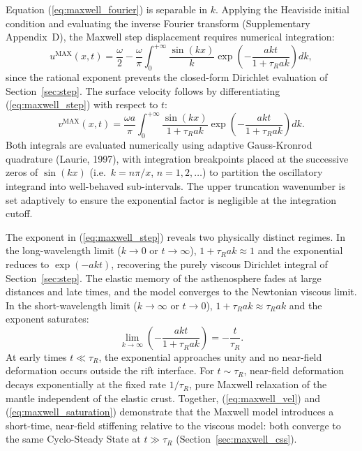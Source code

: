 \documentclass[12pt]{article}
\begin{document}
Equation (\ref{eq:maxwell_fourier}) is separable in $k$. Applying the
Heaviside initial condition and evaluating the inverse Fourier transform
(Supplementary Appendix~D), the Maxwell step displacement requires
numerical integration:
\begin{equation}
u^{\text{MAX}}(x,t) = \frac{\omega}{2}
  - \frac{\omega}{\pi}\int_0^{+\infty}
    \frac{\sin(kx)}{k}\exp\!\left(-\frac{akt}{1+\tau_R ak}\right)dk,
\label{eq:maxwell_step}
\end{equation}
since the rational exponent prevents the closed-form Dirichlet evaluation of
Section~\ref{sec:step}. The surface velocity follows by differentiating
(\ref{eq:maxwell_step}) with respect to $t$:
\begin{equation}
v^{\text{MAX}}(x,t) = \frac{\omega a}{\pi}\int_0^{+\infty}
  \frac{\sin(kx)}{1+\tau_R ak}
  \exp\!\left(-\frac{akt}{1+\tau_R ak}\right)dk.
\label{eq:maxwell_vel}
\end{equation}
Both integrals are evaluated numerically using adaptive Gauss-Kronrod
quadrature (Laurie, 1997), with integration breakpoints placed at the
successive zeros of $\sin(kx)$ (i.e.\ $k = n\pi/x$, $n = 1,2,\ldots$)
to partition the oscillatory integrand into well-behaved sub-intervals.
The upper truncation wavenumber is set adaptively to ensure the
exponential factor is negligible at the integration cutoff.

The exponent in (\ref{eq:maxwell_step}) reveals two physically distinct regimes.
In the long-wavelength limit ($k\to 0$ or $t\to\infty$), $1+\tau_R ak \approx 1$
and the exponential reduces to $\exp(-akt)$, recovering the purely viscous
Dirichlet integral of Section~\ref{sec:step}. The elastic memory of the
asthenosphere fades at large distances and late times, and the model converges
to the Newtonian viscous limit. In the short-wavelength limit ($k\to\infty$ or
$t\to 0$), $1+\tau_R ak \approx \tau_R ak$ and the exponent saturates:
\begin{equation}
\lim_{k\to\infty}\left(-\frac{akt}{1+\tau_R ak}\right) = -\frac{t}{\tau_R}.
\label{eq:maxwell_saturation}
\end{equation}
At early times $t\ll\tau_R$, the exponential approaches unity and no near-field
deformation occurs outside the rift interface. For $t\sim\tau_R$, near-field
deformation decays exponentially at the fixed rate $1/\tau_R$, pure Maxwell
relaxation of the mantle independent of the elastic crust.
Together, (\ref{eq:maxwell_vel}) and (\ref{eq:maxwell_saturation}) demonstrate
that the Maxwell model introduces a short-time, near-field stiffening relative
to the viscous model: both converge to the same Cyclo-Steady State at
$t\gg\tau_R$ (Section~\ref{sec:maxwell_css}).
\end{document}
